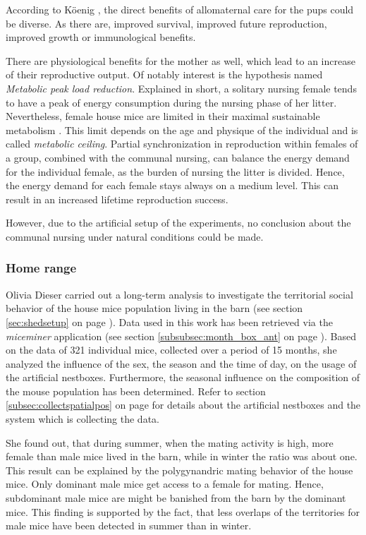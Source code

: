 According to K\"oenig \cite{koenig:06}, the direct benefits of allomaternal care for the pups could be diverse. As there are, improved survival, improved future reproduction, improved growth or immunological benefits.

There are physiological benefits for the mother as well, which lead to an increase of their reproductive output. Of notably interest is the hypothesis named \textit{Metabolic peak load reduction}. Explained in short, a solitary nursing female tends to have a peak of energy consumption during the nursing phase of her litter. Nevertheless, female house mice are limited in their maximal sustainable metabolism \cite{hammond:92}. This limit depends on the age and physique of the individual and is called \textit{metabolic ceiling}. Partial synchronization in reproduction within females of a group, combined with the communal nursing, can balance the energy demand for the individual female, as the burden of nursing the litter is divided. Hence, the energy demand for each female stays always on a medium level\cite{koenig:06}. This can result in an increased lifetime reproduction success.

However, due to the artificial setup of the experiments, no conclusion about the communal nursing under natural conditions could be made.

\subsubsection{Home range}
\label{subsubsec:homerange}

Olivia Dieser \cite{dieser:08} carried out a long-term analysis to investigate the territorial social behavior of the house mice population living in the barn (see section \ref{sec:shedsetup} on page \pageref{sec:shedsetup}). Data used in this work has been retrieved via the \textit{miceminer} application (see section \ref{subsubsec:month_box_ant} on page \pageref{subsubsec:month_box_ant}). Based on the data of 321 individual mice, collected over a period of 15 months, she analyzed the influence of the sex, the season and the time of day, on the usage of the artificial nestboxes. Furthermore, the seasonal influence on the composition of the mouse population has been determined. Refer to section \ref{subsec:collectspatialpos} on page \pageref{subsec:collectspatialpos} for details about the artificial nestboxes and the system which is collecting the data.

She found out, that during summer, when the mating activity is high, more female than male mice lived in the barn, while in winter the ratio was about one. This result can be explained by the polygynandric mating behavior of the house mice. Only dominant male mice get access to a female for mating. Hence, subdominant male mice are might be banished from the barn by the dominant mice. This finding is supported by the fact, that less overlaps of the territories for male mice have been detected in summer than in winter. 


